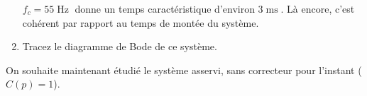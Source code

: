 \begin{enumerate}
{		$f_c = 55\operatorname{Hz}$ donne un temps caractéristique d'environ $3\operatorname{ms}$. Là encore, c'est cohérent par rapport au temps de montée du système.
	}
	
	\item Tracez le diagramme de Bode de ce système.
\end{enumerate}


On souhaite maintenant étudié le système asservi, sans correcteur pour l'instant ($C(p) = 1$).

